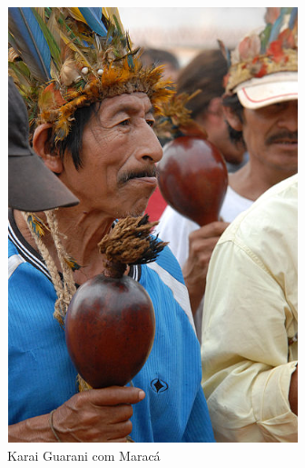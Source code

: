 \begin{figure}[htpb!]
\includegraphics[width=\textwidth]{./imgs/art18.png}
\caption{Karai Guarani com Maracá}
\end{figure}

